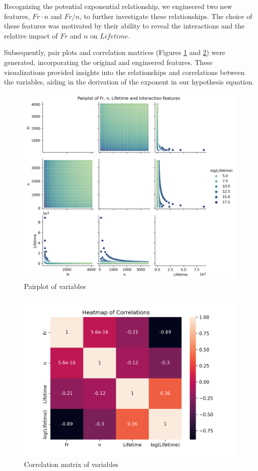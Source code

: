 Recognizing the potential exponential relationship, we engineered two new features, \(Fr \cdot n\) and \(Fr/n\), to further investigate these relationships. The choice of these features was motivated by their ability to reveal the interactions and the relative impact of \(Fr\) and \(n\) on \(Lifetime\).

Subsequently, pair plots and correlation matrices (Figures \ref{fig:bearings-pairplot} and \ref{fig:bearings-corrmat}) were generated, incorporating the original and engineered features. These visualizations provided insights into the relationships and correlations between the variables, aiding in the derivation of the exponent in our hypothesis equation.

\begin{figure}[ht]
    \centering
    \includegraphics[width=\textwidth]{assets/bearings-eda/pairplot.png}
    \caption{Pairplot of variables}
    \label{fig:bearings-pairplot}
\end{figure}

\begin{figure}[ht]
    \centering
    \includegraphics[width=\textwidth]{assets/bearings-eda/correlation-matrix.png}
    \caption{Correlation matrix of variables}
    \label{fig:bearings-corrmat}
\end{figure}

